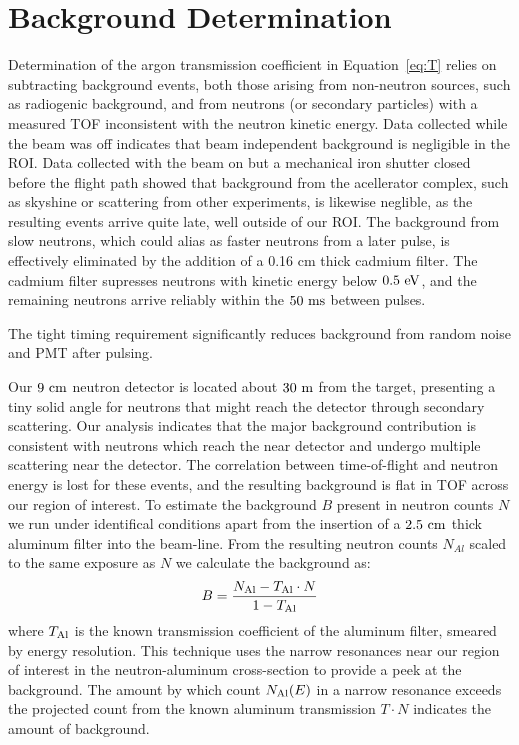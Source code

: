 \documentclass[%
 reprint,
superscriptaddress,
 preprintnumbers,
 nofootinbib,
 nobibnotes,
 bibnotes,
 amsmath,amssymb,
 aps,
 prl, 
 floatfix,
]{revtex4-1}
\begin{document}
\section{\label{sec:energy}Background Determination}

Determination of the argon transmission coefficient in
Equation~\ref{eq:T} relies on subtracting background events, both
those arising from non-neutron sources, such as radiogenic background,
and from neutrons (or secondary particles) with a measured TOF
inconsistent with the neutron kinetic energy.  Data collected while
the beam was off indicates that beam independent background is
negligible in the ROI.  Data collected with the beam on but a
mechanical iron shutter closed before the flight path showed that
background from the acellerator complex, such as skyshine or
scattering from other experiments, is likewise neglible, as the
resulting events arrive quite late, well outside of our ROI.  The
background from slow neutrons, which could alias as faster neutrons
from a later pulse, is effectively eliminated by the addition of a
0.16 cm thick cadmium filter.  The cadmium filter supresses neutrons
with kinetic energy below $0.5~\rm eV$, and the remaining neutrons
arrive reliably within the $50~\rm ms$ between pulses.

The tight timing requirement significantly reduces background from
random noise and PMT after pulsing.

Our $9~\rm cm$ neutron detector is located about $30~\rm m$ from the
target, presenting a tiny solid angle for neutrons that might reach
the detector through secondary scattering.  Our analysis indicates
that the major background contribution is consistent with neutrons
which reach the near detector and undergo multiple scattering near the
detector.  The correlation between time-of-flight and neutron energy
is lost for these events, and the resulting background is flat in TOF
across our region of interest.  To estimate the background $B$
present in neutron counts $N$ we run under identifical conditions
apart from the insertion of a $2.5~\rm cm$ thick aluminum filter into
the beam-line.  From the resulting neutron counts $N_{Al}$ scaled
to the same exposure as $N$ we calculate the background as:
\begin{equation}
  B = \frac{N_{\rm Al} - T_{\rm Al} \cdot N}{1-T_{\rm Al}}
\label{eq:B}
\end{equation}
where $T_{\rm Al}$ is the known transmission coefficient of the
aluminum filter, smeared by energy resolution.  This technique \cite{Brown:2017accapp} uses the
narrow resonances near our region of interest in the neutron-aluminum
cross-section to provide a peek at the background.  The amount by
which count $N_{\rm Al}(E)$ in a narrow resonance exceeds the
projected count from the known aluminum transmission $T \cdot N$
indicates the amount of background.
\end{document}
